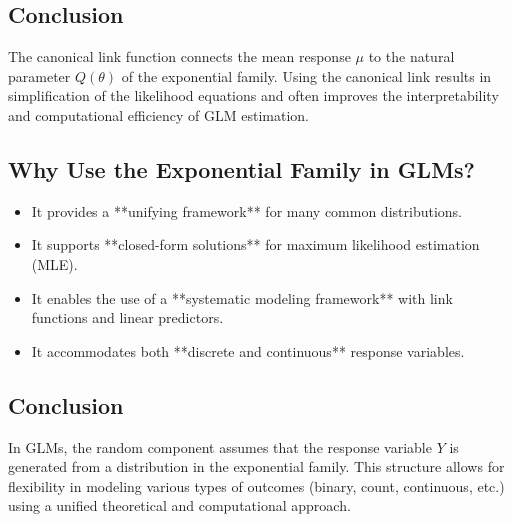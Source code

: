 \documentclass[12pt,a4paper]{article}
\begin{document}
\subsection*{Conclusion}

The canonical link function connects the mean response \( \mu \) to the natural parameter \( Q(\theta) \) of the exponential family. Using the canonical link results in simplification of the likelihood equations and often improves the interpretability and computational efficiency of GLM estimation.




\subsection*{Why Use the Exponential Family in GLMs?}

\begin{itemize}
  \item It provides a **unifying framework** for many common distributions.
  \item It supports **closed-form solutions** for maximum likelihood estimation (MLE).
  \item It enables the use of a **systematic modeling framework** with link functions and linear predictors.
  \item It accommodates both **discrete and continuous** response variables.
\end{itemize}

\subsection*{Conclusion}

In GLMs, the random component assumes that the response variable \( Y \) is generated from a distribution in the exponential family. This structure allows for flexibility in modeling various types of outcomes (binary, count, continuous, etc.) using a unified theoretical and computational approach.
\end{document}
